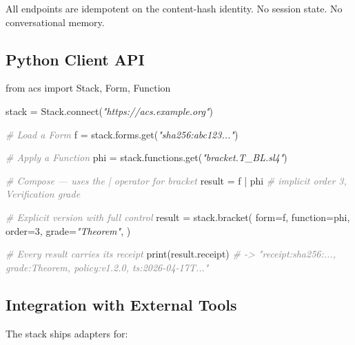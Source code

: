 \documentclass[11pt,a4paper]{article}
\newenvironment{Shaded}{\begin{snugshade}\small}{\end{snugshade}}
\newcommand{\ImportTok}[1]{#1}
\newcommand{\DecValTok}[1]{#1}
\newcommand{\StringTok}[1]{\textit{#1}}
\newcommand{\CommentTok}[1]{\textit{\textcolor{gray}{#1}}}
\newcommand{\OperatorTok}[1]{#1}
\newcommand{\BuiltInTok}[1]{#1}
\newcommand{\ExtensionTok}[1]{#1}
\newcommand{\NormalTok}[1]{#1}
\begin{document}
All endpoints are idempotent on the content-hash identity. No session
state. No conversational memory.

\hypertarget{python-client-api}{%
\subsection{Python Client API}\label{python-client-api}}

\begin{Shaded}
\begin{Highlighting}[]
\ImportTok{from}\NormalTok{ acs }\ImportTok{import}\NormalTok{ Stack, Form, Function}

\NormalTok{stack }\OperatorTok{=}\NormalTok{ Stack.}\ExtensionTok{connect}\NormalTok{(}\StringTok{"https://acs.example.org"}\NormalTok{)}

\CommentTok{\# Load a Form}
\NormalTok{f }\OperatorTok{=}\NormalTok{ stack.forms.get(}\StringTok{"sha256:abc123..."}\NormalTok{)}

\CommentTok{\# Apply a Function}
\NormalTok{phi }\OperatorTok{=}\NormalTok{ stack.functions.get(}\StringTok{"bracket.T\_BL.sl4"}\NormalTok{)}

\CommentTok{\# Compose --- uses the | operator for bracket}
\NormalTok{result }\OperatorTok{=}\NormalTok{ f }\OperatorTok{|}\NormalTok{ phi  }\CommentTok{\# implicit order 3, Verification grade}

\CommentTok{\# Explicit version with full control}
\NormalTok{result }\OperatorTok{=}\NormalTok{ stack.bracket(}
\NormalTok{    form}\OperatorTok{=}\NormalTok{f,}
\NormalTok{    function}\OperatorTok{=}\NormalTok{phi,}
\NormalTok{    order}\OperatorTok{=}\DecValTok{3}\NormalTok{,}
\NormalTok{    grade}\OperatorTok{=}\StringTok{"Theorem"}\NormalTok{,}
\NormalTok{)}

\CommentTok{\# Every result carries its receipt}
\BuiltInTok{print}\NormalTok{(result.receipt)}
\CommentTok{\# {-}\textgreater{} "receipt:sha256:..., grade:Theorem, policy:v1.2.0, ts:2026{-}04{-}17T..."}
\end{Highlighting}
\end{Shaded}

\hypertarget{integration-with-external-tools}{%
\subsection{Integration with External
Tools}\label{integration-with-external-tools}}

The stack ships adapters for:
\end{document}
